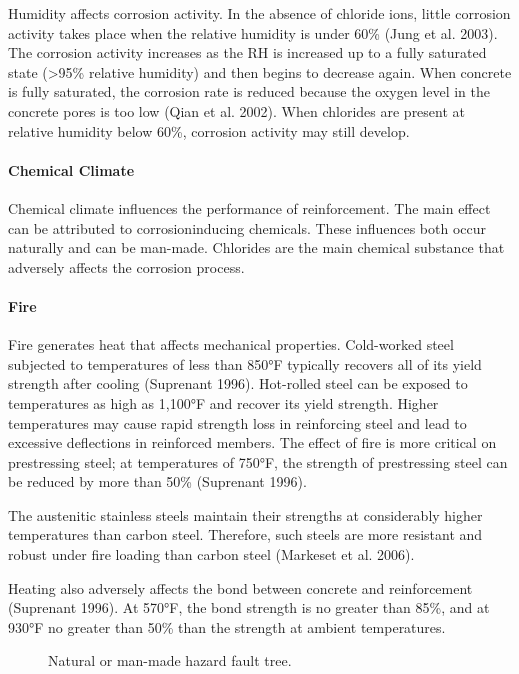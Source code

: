 Humidity affects corrosion activity. In the absence of chloride ions, little corrosion activity takes place when the
relative humidity is under 60\% (Jung et al. 2003). The corrosion activity increases as the RH is increased up to a
fully saturated state (>95\% relative humidity) and then begins to decrease again. When concrete is fully saturated,
the corrosion rate is reduced because the oxygen level in the concrete pores is too low (Qian et al. 2002). When
chlorides are present at relative humidity below 60\%, corrosion activity may still develop.

\paragraph{Chemical Climate}
Chemical climate influences the performance of reinforcement. The main effect can be attributed to corrosioninducing
chemicals. These influences both occur naturally and can be man-made. Chlorides are the main chemical
substance that adversely affects the corrosion process.

\paragraph{Fire}
Fire generates heat that affects mechanical properties. Cold-worked steel subjected to temperatures of less than 850°F typically recovers all of its yield strength after cooling (Suprenant 1996). Hot-rolled steel can be exposed to temperatures as high as 1,100°F and recover its yield strength. Higher temperatures may cause rapid strength loss in reinforcing steel and lead to excessive deflections in reinforced members. The effect of fire is more critical on prestressing steel; at temperatures of 750°F, the strength of prestressing steel can be reduced by more than 50\% (Suprenant 1996). 

The austenitic stainless steels maintain their strengths at considerably higher temperatures than carbon steel. Therefore, such steels are more resistant and robust under fire loading than carbon steel (Markeset et al. 2006). 

Heating also adversely affects the bond between concrete and reinforcement (Suprenant 1996). At 570°F, the bond strength is no greater than 85\%, and at 930°F no greater than 50\% than the strength at ambient temperatures.

\begin{figure}
  \caption{Natural or man-made hazard fault tree.}\label{fig:fault-tree-natural-manmade}
\end{figure}

